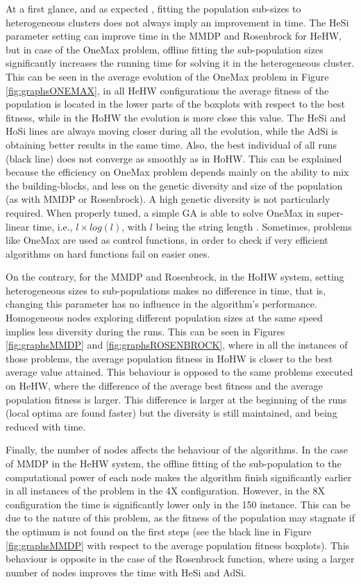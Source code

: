 \documentclass[final,1p,times]{elsarticle}
\begin{document}
At a first glance, and as expected \cite{Wolpert97NFL}, fitting the
population sub-sizes to heterogeneous clusters does not always imply an
improvement in time. The HeSi parameter setting can improve time in
the MMDP and Rosenbrock for HeHW, but in case of the OneMax problem,
offline fitting  the sub-population sizes significantly increases  the running time for solving it in the heterogeneous cluster. This can be seen in the average evolution of the OneMax problem in Figure \ref{fig:graphsONEMAX}, in all HeHW configurations the average fitness of the population is located in the lower parts of the boxplots with respect to the best fitness, while in the HoHW the evolution is more close this value. The HeSi and HoSi lines are always moving closer during all the evolution, while the AdSi is obtaining better results in the same time. Also, the best individual of all runs (black line) does not converge as smoothly as in HoHW.
This can be explained because the efficiency on OneMax problem depends mainly on the ability to mix
the building-blocks, and less on the genetic diversity and size of the
population (as with MMDP or Rosenbrock). A high genetic diversity is not particularly
required. When properly tuned, a simple GA is able to solve OneMax in super-linear time, i.e., $l \times log(l)$, with $l$ being the string length \cite{Verma09MapReduce}. Sometimes, problems like OneMax are used
as control functions, in order to check if very efficient algorithms
on hard functions fail on easier ones. 

On the contrary, for the MMDP and Rosenbrock, in the HoHW system,
setting heterogeneous sizes to sub-populations makes no difference in
time, that is, changing this parameter has no influence in the
algorithm's performance. Homogeneous nodes exploring different population sizes at the same speed implies less diversity during the runs. This can be seen in Figures \ref{fig:graphsMMDP} and \ref{fig:graphsROSENBROCK}, where in all the instances of those problems, the average population fitness in HoHW is closer to the best average value attained. This behaviour is opposed to the same problems executed on HeHW, where the difference of the average best fitness and the average population fitness is larger. This difference is  larger at the beginning of the runs (local optima are found faster) but the diversity is still maintained, and being reduced with time.



Finally, the number of nodes affects the behaviour of the
algorithms. In the case of MMDP in the HeHW system, the offline
fitting of the sub-population to the computational  power of each node
makes the algorithm finish significantly earlier in all instances of
the problem in the 4X configuration. However, in the 8X configuration
the time is significantly lower only in the 150 instance. This can be
due to the nature of this problem, as the fitness of the population may stagnate if the optimum is not found on the first steps (see the black line in Figure \ref{fig:graphsMMDP} with respect to the average population fitness boxplots). This behaviour is opposite in the case of the Rosenbrock function, where using a larger number of nodes improves the time with HeSi and AdSi. %
\end{document}
